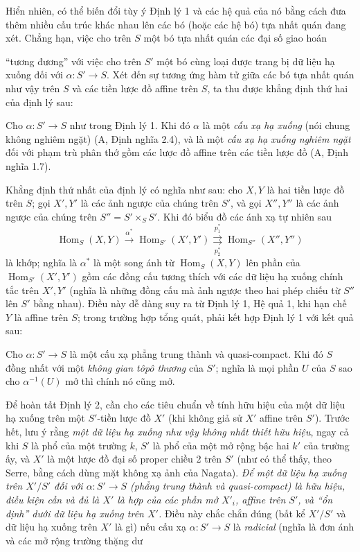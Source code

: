 Hiển nhiên, có thể biến đổi tùy ý Định lý 1 và các hệ quả của nó bằng cách đưa
thêm nhiều cấu trúc khác nhau lên các bó (hoặc các hệ bó) tựa nhất quán đang
xét. Chẳng hạn, việc cho trên $S$ một bó tựa nhất quán các đại số giao hoán

``tương đương'' với việc cho trên $S'$ một bó cùng loại được trang bị dữ liệu
hạ xuống đối với $\alpha:S'\longrightarrow S$. Xét đến sự tương ứng hàm tử
giữa các bó tựa nhất quán như vậy trên $S$ và các tiền lược đồ affine trên $S$,
ta thu được khẳng định thứ hai của định lý sau:

 Cho $\alpha:S'\longrightarrow S$ như trong Định lý 1. Khi
đó $\alpha$ là một \emph{cấu xạ hạ xuống} (nói chung không nghiêm ngặt)
(A, Định nghĩa 2.4), và là một \emph{cấu xạ hạ xuống nghiêm ngặt} đối với phạm
trù phân thớ gồm các lược đồ affine trên các tiền lược đồ (A, Định nghĩa 1.7).

Khẳng định thứ nhất của định lý có nghĩa như sau: cho $X,Y$ là hai tiền lược đồ
trên $S$; gọi $X',Y'$ là các ảnh ngược của chúng trên $S'$, và gọi $X'',Y''$
là các ảnh ngược của chúng trên $S''=S'\times_SS'$. Khi đó biểu đồ các ánh xạ
tự nhiên sau
\[
  \operatorname{Hom}_S(X,Y)\xrightarrow{\alpha^*}
  \operatorname{Hom}_{S'}(X',Y')
  \underset{p_2^*}{\overset{p_1^*}{\rightrightarrows}}
  \operatorname{Hom}_{S''}(X'',Y'')
\]
là khớp; nghĩa là $\alpha^*$ là một song ánh từ
$\operatorname{Hom}_S(X,Y)$ lên phần của $\operatorname{Hom}_{S'}(X',Y')$ gồm
các đồng cấu tương thích với các dữ liệu hạ xuống chính tắc trên $X',Y'$ (nghĩa
là những đồng cấu mà ảnh ngược theo hai phép chiếu từ $S''$ lên $S'$ bằng
nhau). Điều này dễ dàng suy ra từ Định lý 1, Hệ quả 1, khi hạn chế $Y$ là affine
trên $S$; trong trường hợp tổng quát, phải kết hợp Định lý 1 với kết quả sau:

 Cho $\alpha:S'\longrightarrow S$ là một cấu xạ phẳng trung
thành và quasi-compact. Khi đó $S$ đồng nhất với một \emph{không gian tôpô
thương} của $S'$; nghĩa là mọi phần $U$ của $S$ sao cho $\alpha^{-1}(U)$ mở thì
chính nó cũng mở.

Để hoàn tất Định lý 2, cần cho các tiêu chuẩn về tính hữu hiệu của một dữ liệu
hạ xuống trên một $S'$-tiền lược đồ $X'$ (khi không giả sử $X'$ affine trên
$S'$). Trước hết, lưu ý rằng \emph{một dữ liệu hạ xuống như vậy không nhất
thiết hữu hiệu}, ngay cả khi $S$ là phổ của một trường $k$, $S'$ là phổ của một
mở rộng bậc hai $k'$ của trường ấy, và $X'$ là một lược đồ đại số proper chiều 2 trên
$S'$ (như có thể thấy, theo Serre, bằng cách dùng mặt không xạ ảnh của Nagata).
\emph{Để một dữ liệu hạ xuống trên $X'/S'$ đối với
$\alpha:S'\longrightarrow S$ (phẳng trung thành và quasi-compact) là hữu hiệu,
điều kiện cần và đủ là $X'$ là hợp của các phần mở $X'_i$, affine trên $S'$, và
``ổn định'' dưới dữ liệu hạ xuống trên $X'$.} Điều này chắc chắn đúng (bất kể
$X'/S'$ và dữ liệu hạ xuống trên $X'$ là gì) nếu cấu xạ
$\alpha:S'\longrightarrow S$ là \emph{radicial} (nghĩa là đơn ánh và các mở
rộng trường thặng dư

